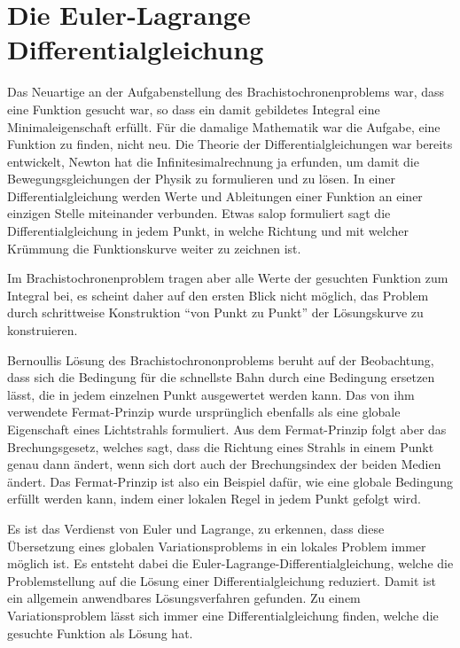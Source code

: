 %
%
%
\section{Die Euler-Lagrange Differentialgleichung
\label{buch:variation:section:eulerlagrange}}
Das Neuartige an der Aufgabenstellung des Brachistochronenproblems
war, dass eine Funktion gesucht war, so dass ein damit gebildetes
Integral eine Minimaleigenschaft erfüllt.
Für die damalige Mathematik war die Aufgabe, eine Funktion zu finden,
nicht neu.
Die Theorie der Differentialgleichungen war bereits entwickelt,
Newton hat die Infinitesimalrechnung ja erfunden, um damit die
Bewegungsgleichungen der Physik zu formulieren und zu lösen.
In einer Differentialgleichung werden Werte und Ableitungen einer
Funktion an einer einzigen Stelle miteinander verbunden.
Etwas salop formuliert sagt die Differentialgleichung in jedem
Punkt, in welche Richtung und mit welcher Krümmung die Funktionskurve
weiter zu zeichnen ist.

Im Brachistochronenproblem tragen aber alle Werte der gesuchten
Funktion zum Integral bei, es scheint daher auf den ersten Blick
nicht möglich, das Problem durch schrittweise Konstruktion
``von Punkt zu Punkt'' der Lösungskurve zu konstruieren.

Bernoullis Lösung des Brachistochrononproblems beruht auf der
Beobachtung, dass sich die Bedingung für die schnellste Bahn
durch eine Bedingung ersetzen lässt, die in jedem einzelnen
Punkt ausgewertet werden kann.
Das von ihm verwendete Fermat-Prinzip wurde ursprünglich ebenfalls
als eine globale Eigenschaft eines Lichtstrahls formuliert.
Aus dem Fermat-Prinzip folgt aber das Brechungsgesetz, welches
sagt, dass die Richtung eines Strahls in einem Punkt genau dann
ändert, wenn sich dort auch der Brechungsindex der beiden Medien
ändert.
Das Fermat-Prinzip ist also ein Beispiel dafür, wie eine globale
Bedingung erfüllt werden kann, indem einer lokalen Regel in jedem
Punkt gefolgt wird.

Es ist das Verdienst von Euler und Lagrange, zu erkennen, dass diese
Übersetzung eines globalen Variationsproblems in ein lokales 
Problem immer möglich ist.
Es entsteht dabei die Euler-Lagrange-Differentialgleichung, welche
die Problemstellung auf die Lösung einer Differentialgleichung
reduziert.
Damit ist ein allgemein anwendbares Lösungsverfahren gefunden.
Zu einem Variationsproblem lässt sich immer eine Differentialgleichung
finden, welche die gesuchte Funktion als Lösung hat.


